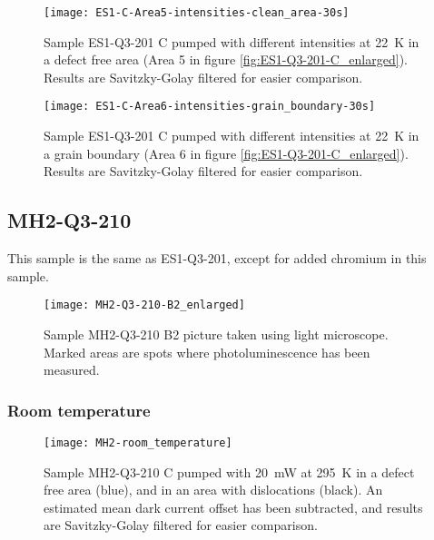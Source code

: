 \begin{figure}[H]
\centering
\texttt{[image: ES1-C-Area5-intensities-clean\_area-30s]}
\caption[ES1-Q3-201 at a defect free area]{Sample ES1-Q3-201 C pumped with different intensities at 22~K in a defect free area (Area 5 in figure \ref{fig:ES1-Q3-201-C_enlarged}). Results are Savitzky-Golay filtered for easier comparison.}
\label{fig:ES1-C-Area5-intensities-clean_area-30s}%
\end{figure}

\begin{figure}[H]
\centering
\texttt{[image: ES1-C-Area6-intensities-grain\_boundary-30s]}
\caption[ES1-Q3-201 at a grain boundary]{Sample ES1-Q3-201 C pumped with different intensities at 22~K in a grain boundary (Area 6 in figure \ref{fig:ES1-Q3-201-C_enlarged}). Results are Savitzky-Golay filtered for easier comparison.}
\label{fig:ES1-C-Area6-intensities-grain_boundary-30s}%
\end{figure}





\subsection{MH2-Q3-210}

This sample is the same as ES1-Q3-201, except for added chromium in this sample.



\begin{figure}[H]
\centering
\texttt{[image: MH2-Q3-210-B2\_enlarged]}
\caption[MH2-Q3-210 B2 from light microscope]{Sample MH2-Q3-210 B2 picture taken using light microscope. Marked areas are spots where photoluminescence has been measured.}
\label{fig:MH2-Q3-210-B2_enlarged}%
\end{figure}



\subsubsection{Room temperature}

\begin{figure}[H]
\centering
\texttt{[image: MH2-room\_temperature]}
\caption[MH2-Q3-210 at room temperature]{Sample MH2-Q3-210 C pumped with 20~mW at 295~K in a defect free area (blue), and in an area with dislocations (black). An estimated mean dark current offset has been subtracted, and results are Savitzky-Golay filtered for easier comparison.}
\label{fig:MH2-room_temperature}%
\end{figure}

